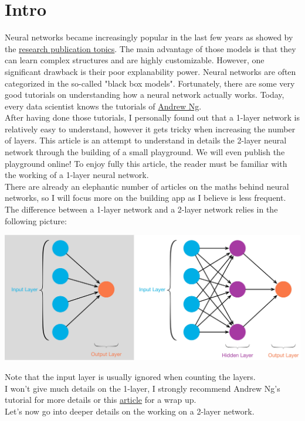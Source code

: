 \section{Intro}

Neural networks became increasingly popular in the last few years as showed by the \href{https://www.kdnuggets.com/2021/05/winning-machine-learning-competition.html}{research publication topics}. The main advantage of those models is that they can learn complex structures and are highly customizable. However, one significant drawback is their poor explanability power. Neural networks are often categorized in the so-called "black box models".
Fortunately, there are some very good tutorials on understanding how a neural network actually works. Today, every data scientist knows the tutorials of \href{https://www.coursera.org/learn/neural-networks-deep-learning}{Andrew Ng}. \\

After having done those tutorials, I personally found out that a 1-layer network is relatively easy to understand, however it gets tricky when increasing the number of layers. This article is an attempt to understand in details the 2-layer neural network through the building of a small playground. We will even publish the playground online! To enjoy fully this article, the reader must be familiar with the working of a 1-layer neural network.\\

There are already an elephantic number of articles on the maths behind neural networks, so I will focus more on the building app as I believe is less frequent. \\

The difference between a 1-layer network and a 2-layer network relies in the following picture: \\

\begin{center}
\includegraphics[scale=0.09]{img/nn-layers.jpeg}
\end{center}

Note that the input layer is usually ignored when counting the layers. \\

I won't give much details on the 1-layer, I strongly recommend Andrew Ng's tutorial for more details or this \href{https://towardsdatascience.com/everything-you-need-to-know-about-neural-networks-and-backpropagation-machine-learning-made-easy-e5285bc2be3a}{article} for a wrap up. \\

Let's now go into deeper details on the working on a 2-layer network.
